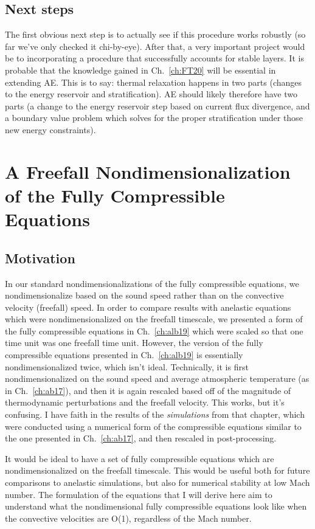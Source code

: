 \subsection{Next steps}
The first obvious next step is to actually see if this procedure works robustly (so far we've only checked it chi-by-eye).
After that, a very important project would be to incorporating a procedure that successfully accounts for stable layers.
It is probable that the knowledge gained in Ch.~\ref{ch:FT20} will be essential in extending AE.
This is to say: thermal relaxation happens in two parts (changes to the energy reservoir and stratification).
AE should likely therefore have two parts (a change to the energy reservoir step based on current flux divergence, and a boundary value problem which solves for the proper stratification under those new energy constraints).


\section{A Freefall Nondimensionalization of the Fully Compressible Equations}
\label{sec:freefall_fc_nondim}
\subsection{Motivation}
In our standard nondimensionalizations of the fully compressible equations, we nondimensionalize based on the sound speed rather than on the convective velocity (freefall) speed.
In order to compare results with anelastic equations which were nondimensionalized on the freefall timescale, we presented a form of the fully compressible equations in Ch.~\ref{ch:alb19} which were scaled so that one time unit was one freefall time unit. 
However, the version of the fully compressible equations presented in Ch.~\ref{ch:alb19} is essentially nondimensionalized twice, which isn't ideal.
Technically, it is first nondimensionalized on the sound speed and average atmospheric temperature (as in Ch.~\ref{ch:ab17}), and then it is again rescaled based off of the magnitude of thermodynamic perturbations and the freefall velocity.
This works, but it's confusing.
I have faith in the results of the \emph{simulations} from that chapter, which were conducted using a numerical form of the compressible equations similar to the one presented in Ch.~\ref{ch:ab17}, and then rescaled in post-processing.

It would be ideal to have a set of fully compressible equations which are nondimensionalized on the freefall timescale.
This would be useful both for future comparisons to anelastic simulations, but also for numerical stability at low Mach number. 
The formulation of the equations that I will derive here aim to understand what the nondimensional fully compressible equations look like when the convective velocities are O(1), regardless of the Mach number.


